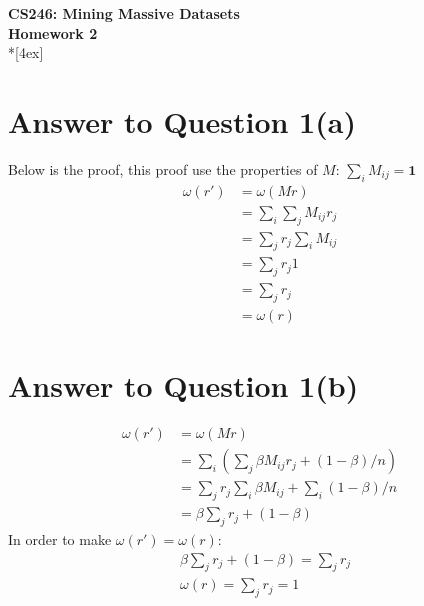 \documentclass[11pt]{article}
\begin{document}
\thispagestyle{empty}
\parindent 0pt
\vfill
\large

\begin{center}
\LARGE{\bf \textsf{CS246: Mining Massive Datasets}}\\ {\bf \textsf{Homework 2}} 
\\*[4ex]
\end{center}

\section*{Answer to Question 1(a)}
Below is the proof, this proof use the properties of $M$: $\sum_iM_{ij}=\mathbf{1}$
\begin{equation*}
\begin{aligned}
    \omega(r') & = \omega(Mr)\\
    & = \sum_i\sum_jM_{ij}r_j\\
    & = \sum_jr_j\sum_iM_{ij}\\
    & = \sum_jr_j1\\
    & = \sum_jr_j\\
    & = \omega(r)
\end{aligned}
\end{equation*}

\pagebreak[4]
\section*{Answer to Question 1(b)}
\begin{equation*}
\begin{aligned}
    \omega(r') & = \omega(Mr)\\
    & = \sum_i(\sum_j\beta M_{ij}r_j+(1-\beta)/n)\\
    & = \sum_jr_j\sum_i\beta M_{ij}+\sum_i(1-\beta)/n\\
    & = \beta\sum_jr_j + (1-\beta)
\end{aligned}
\end{equation*}
In order to make $\omega(r') = \omega(r)$:
\begin{equation}
\begin{aligned}
    & \beta\sum_jr_j + (1-\beta) = \sum_jr_j\\
    & \omega(r) = \sum_jr_j = 1
\end{aligned}
\end{equation}

\pagebreak[4]
\end{document}
